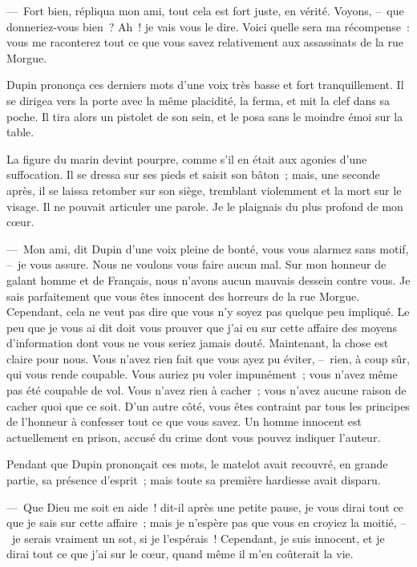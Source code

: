 \documentclass[french,twoside]{book} %
\begin{document}
— Fort bien, répliqua mon ami, tout cela est fort juste, en vérité. Voyons, – que donneriez-vous bien ? Ah ! je vais vous le dire. Voici quelle sera ma récompense : vous me raconterez tout ce que vous savez relativement aux assassinats de la rue Morgue.\par
Dupin prononça ces derniers mots d’une voix très basse et fort tranquillement. Il se dirigea vers la porte avec la même placidité, la ferma, et mit la clef dans sa poche. Il tira alors un pistolet de son sein, et le posa sans le moindre émoi sur la table.\par
La figure du marin devint pourpre, comme s’il en était aux agonies d’une suffocation. Il se dressa sur ses pieds et saisit son bâton ; mais, une seconde après, il se laissa retomber sur son siège, tremblant violemment et la mort sur le visage. Il ne pouvait articuler une parole. Je le plaignais du plus profond de mon cœur.\par
— Mon ami, dit Dupin d’une voix pleine de bonté, vous vous alarmez sans motif, – je vous assure. Nous ne voulons vous faire aucun mal. Sur mon honneur de galant homme et de Français, nous n’avons aucun mauvais dessein contre vous. Je sais parfaitement que vous êtes innocent des horreurs de la rue Morgue. Cependant, cela ne veut pas dire que vous n’y soyez pas quelque peu impliqué. Le peu que je vous ai dit doit vous prouver que j’ai eu sur cette affaire des moyens d’information dont vous ne vous seriez jamais douté. Maintenant, la chose est claire pour nous. Vous n’avez rien fait que vous ayez pu éviter, – rien, à coup sûr, qui vous rende coupable. Vous auriez pu voler impunément ; vous n’avez même pas été coupable de vol. Vous n’avez rien à cacher ; vous n’avez aucune raison de cacher quoi que ce soit. D’un autre côté, vous êtes contraint par tous les principes de l’honneur à confesser tout ce que vous savez. Un homme innocent est actuellement en prison, accusé du crime dont vous pouvez indiquer l’auteur.\par
Pendant que Dupin prononçait ces mots, le matelot avait recouvré, en grande partie, sa présence d’esprit ; mais toute sa première hardiesse avait disparu.\par
— Que Dieu me soit en aide ! dit-il après une petite pause, je vous dirai tout ce que je sais sur cette affaire ; mais je n’espère pas que vous en croyiez la moitié, – je serais vraiment un sot, si je l’espérais ! Cependant, je suis innocent, et je dirai tout ce que j’ai sur le cœur, quand même il m’en coûterait la vie.\par
\end{document}
